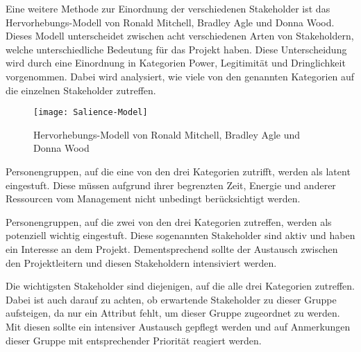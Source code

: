 Eine weitere Methode zur Einordnung der verschiedenen Stakeholder ist das Hervorhebungs-Modell von Ronald Mitchell, Bradley Agle und Donna Wood.
Dieses Modell unterscheidet zwischen acht verschiedenen Arten von Stakeholdern, welche unterschiedliche Bedeutung für das Projekt haben.
Diese Unterscheidung wird durch eine Einordnung in Kategorien Power, Legitimität und Dringlichkeit vorgenommen.
Dabei wird analysiert, wie viele von den genannten Kategorien auf die einzelnen Stakeholder zutreffen.

\begin{figure}[ht]
    \centering
    \texttt{[image: Salience-Model]}
    \caption{Hervorhebungs-Modell von Ronald Mitchell, Bradley Agle und Donna Wood\autocite[Seite 874]{Mitchell.1997}}
    \label{fig:highlight-model}
\end{figure}

Personengruppen, auf die eine von den drei Kategorien zutrifft, werden als latent eingestuft.
Diese müssen aufgrund ihrer begrenzten Zeit, Energie und anderer Ressourcen vom Management nicht unbedingt berücksichtigt werden.

Personengruppen, auf die zwei von den drei Kategorien zutreffen, werden als potenziell wichtig eingestuft.
Diese sogenannten  Stakeholder sind aktiv und haben ein Interesse an dem Projekt.
Dementsprechend sollte der Austausch zwischen den Projektleitern und diesen Stakeholdern intensiviert werden.

Die wichtigsten Stakeholder sind diejenigen, auf die alle drei Kategorien zutreffen.
Dabei ist auch darauf zu achten, ob erwartende Stakeholder zu dieser Gruppe aufsteigen, da nur ein Attribut fehlt, um dieser Gruppe zugeordnet zu werden.
Mit diesen sollte ein intensiver Austausch gepflegt werden und auf Anmerkungen dieser Gruppe mit entsprechender Priorität reagiert werden\autocite[vgl.][Seite 874ff]{Mitchell.1997}.
